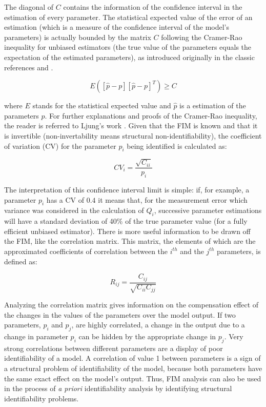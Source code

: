 The diagonal of $C$ contains the information of the confidence interval in the estimation of every parameter. The statistical expected value of the error of an estimation (which is a measure of the confidence interval of the model's parameters) is actually bounded by the matrix $C$ following the Cramer-Rao inequality for unbiased estimators (the true value of the parameters equals the expectation of the estimated parameters), as introduced originally in the classic references \cite{cramer1946mathematical} and \cite{rao2009linear}. 

\begin{equation}
	E \left( \left[ \hat{p}-p\right]\left[ \hat{p}-p\right]^{T}\right) \geq C
\label{eq:CRineq}
\end{equation}

where $E$ stands for the statistical expected value and $\hat{p}$ is a estimation of the parameters $p$. For further explanations and proofs of the Cramer-Rao inequality, the reader is referred to Ljung's work \cite{ljung1999system}. Given that the FIM is known and that it is invertible (non-invertability means structural non-identifiability), the coefficient of variation (CV) for the parameter $p_{i}$ being identified is calculated as:

\begin{equation}
	CV_{i}=\frac{\sqrt{C_{ii}}}{p_{i}}
\label{eq:CR}
\end{equation}

The interpretation of this confidence interval limit is simple: if, for example, a parameter $p_{i}$ has a CV of $0.4$ it means that, for the measurement error which variance was considered in the calculation of $Q_{i}$, successive parameter estimations will have a standard deviation of 40\% of the true parameter value (for a fully efficient unbiased estimator). There is more useful information to be drawn off the FIM, like the correlation matrix. This matrix, the elements of which are the approximated coefficients of correlation between the $i^{th}$ and the $j^{th}$ parameters, is defined as:

\begin{equation}
	R_{ij}=\frac{C_{ij}}{\sqrt{C_{ii}C_{jj}}}
\label{eq:FIMcorrelation}
\end{equation}

Analyzing the correlation matrix gives information on the compensation effect of the changes in the values of the parameters over the model output. If two parameters, $p_{i}$ and $p_{j}$, are highly correlated, a change in the output due to a change in parameter $p_{i}$ can be hidden by the appropriate change in $p_{j}$. Very strong correlations between different parameters are a display of poor identifiability of a model. A correlation of value 1 between parameters is a sign of a structural problem of identifiability of the model, because both parameters have the same exact effect on the model's output. Thus, FIM analysis can also be used in the process of \textit{a priori} identifiability analysis by identifying structural identifiability problems.

